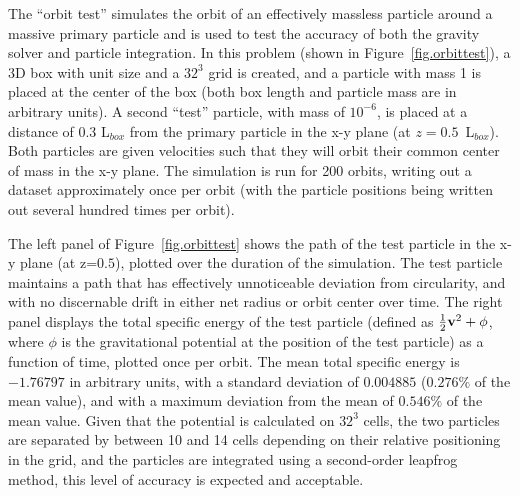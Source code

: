The ``orbit test'' simulates the orbit of an effectively massless
particle around a massive primary particle and is used to test the
accuracy of both the gravity solver and particle integration.  In this
problem (shown in Figure~\ref{fig.orbittest}), a 3D box with unit size
and a $32^3$ grid is created, and a particle with mass 1 is placed at
the center of the box (both box length and particle mass are in
arbitrary units).  A second ``test'' particle, with mass of $10^{-6}$,
is placed at a distance of 0.3 L$_{box}$ from the primary particle in
the x-y plane (at $z=0.5$~L$_{box}$).  Both particles are given
velocities such that they will orbit their common center of mass in
the x-y plane.  The simulation is run for 200 orbits, writing
out a dataset 
approximately once per orbit (with the particle positions being
written out several hundred times per orbit).

The left panel of Figure~\ref{fig.orbittest} shows the path of the
test particle in the x-y plane (at z=$0.5$), plotted over the duration
of the simulation.  The test particle
maintains a path that has effectively unnoticeable deviation from
circularity, and with no discernable drift in either net radius or
orbit center over time.  The right panel displays the total specific
energy of the test particle (defined as $\frac{1}{2} {\bf v}^2 +
\phi$, where $\phi$ is the gravitational potential at the position of
the test particle) as a function of time, plotted once per orbit.  The
mean total specific energy is $-1.76797$ in arbitrary units, with a
standard deviation of $0.004885$ ($0.276\%$ of the mean value), and
with a maximum deviation from the mean of $0.546\%$ of the mean value.
Given that the potential is calculated on $32^3$ cells, the two
particles are separated by between 10 and 14 cells depending on their
relative positioning in the grid, and the particles are integrated
using a second-order leapfrog method, this level of accuracy is
expected and acceptable.
